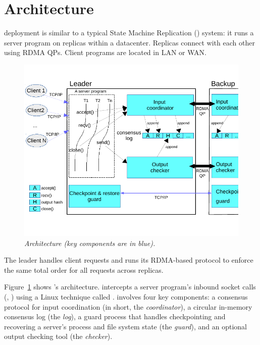 \section{Architecture} \label{sec:arch}

\xxx deployment is similar to a typical State Machine Replication (\smr) 
system: it runs a server program on replicas within a datacenter. Replicas 
connect with each other using RDMA QPs. Client programs are located in LAN or 
WAN.

\begin{figure}[ht]
\begin{center}
\includegraphics{figures/arch}
\caption{\em \xxx Architecture (key components are in
  blue).}\label{fig:arch}
\end{center}
\end{figure}

The \xxx leader handles client requests and runs its RDMA-based protocol to 
enforce the same total order for all requests across replicas.

Figure~\ref{fig:arch} shows \xxx's architecture. \xxx intercepts a server 
program's inbound socket calls (\eg, \recv) using a Linux technique called 
\ldpreload. \xxx involves four key components: a \paxos consensus protocol for 
input coordination (in short, the \emph{coordinator}), a circular in-memory 
consensus log (the \emph{log}), a guard process that handles checkpointing 
and recovering a server's process and file system state (the 
\emph{guard}), and an optional output checking tool (the \emph{checker}).

